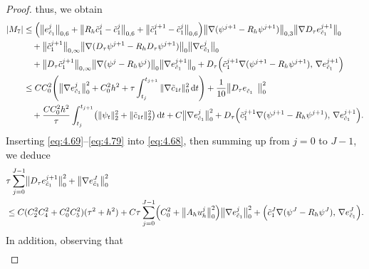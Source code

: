 \documentclass[a4paper,fleqn]{cas-sc}
\numberwithin{equation}{section}
\theoremstyle{definition}
\begin{document}
\begin{proof}
thus, we obtain
\begin{align}
  |M_{7}|
  &\leq \Bigl(\bigl\|e_{\tilde{c}_{1}}^{j}\bigr\|_{0,6}
             + \bigl\|R_{h}\tilde{c}_{1}^{j} - \tilde{c}_{1}^{j}\bigr\|_{0,6}
             + \bigl\|\tilde{c}_{1}^{j+1} - \tilde{c}_{1}^{j}\bigr\|_{0,6}\Bigr)
    \bigl\|\nabla(\psi^{j+1} - R_{h}\psi^{j+1})\bigr\|_{0,3}
    \bigl\|\nabla D_{\tau}e_{\tilde{c}_{1}}^{j+1}\bigr\|_{0}
  \nonumber\\
  &\quad + \bigl\|\tilde{c}_{1}^{j+1}\bigr\|_{0,\infty}
    \bigl\|\nabla(D_{\tau}\psi^{j+1} - R_{h}D_{\tau}\psi^{j+1})\bigr\|_{0}
    \bigl\|\nabla e_{\tilde{c}_{1}}^{j}\bigr\|_{0}
  \nonumber\\
  &\quad + \bigl\|D_{\tau}\tilde{c}_{1}^{j+1}\bigr\|_{0,\infty}
    \bigl\|\nabla(\psi^{j} - R_{h}\psi^{j})\bigr\|_{0}
    \bigl\|\nabla e_{\tilde{c}_{1}}^{j+1}\bigr\|_{0}
  + D_{\tau}\Bigl(\tilde{c}_{1}^{j+1}\nabla(\psi^{j+1} - R_{h}\psi^{j+1}),\,
                   \nabla e_{\tilde{c}_{1}}^{j+1}\Bigr)
  \nonumber\\
  &\leq CC_{0}^{2}\!\left(\bigl\|\nabla e_{\tilde{c}_{1}}^{j}\bigr\|_{0}^{2}
    + C_{0}^{2}h^{2}
    + \tau\int_{t_{j}}^{t_{j+1}}\|\nabla\tilde{c}_{1t}\|_{0}^{2}\,\mathrm{d}t\right)
   + \frac{1}{10}\bigl\|D_{\tau}e_{\tilde{c}_{1}}^{\phantom{j+1}\!}\bigr\|_{0}^{2}
  \nonumber\\
  &\quad + \frac{CC_{0}^{2}h^{2}}{\tau}\int_{t_{j}}^{t_{j+1}}
    \bigl(\|\psi_{t}\|_{2}^{2} + \|\tilde{c}_{1t}\|_{2}^{2}\bigr)\,\mathrm{d}t
   + C\bigl\|\nabla e_{\tilde{c}_{1}}^{j}\bigr\|_{0}^{2}
   + D_{\tau}\Bigl(\tilde{c}_{1}^{j+1}\nabla(\psi^{j+1} - R_{h}\psi^{j+1}),\,
                   \nabla e_{\tilde{c}_{1}}^{j+1}\Bigr).
  \label{eq:4.79}
\end{align}
Inserting \eqref{eq:4.69}--\eqref{eq:4.79} into \eqref{eq:4.68}, then summing up from
$j = 0$ to $J-1$, we deduce
\begin{align}
  &\tau\sum_{j=0}^{J-1}\bigl\|D_{\tau}e_{\tilde{c}_{1}}^{j+1}\bigr\|_{0}^{2}
   + \bigl\|\nabla e_{\tilde{c}_{1}}^{J}\bigr\|_{0}^{2}
  \nonumber\\
  &\leq C(C_{2}^{2}C_{4}^{2} + C_{0}^{2}C_{5}^{2})(\tau^{2}+h^{2})
   + C\tau\sum_{j=0}^{J-1}\Bigl(C_{0}^{2}
                                 + \bigl\|A_{h}u_{h}^{j}\bigr\|_{0}^{2}\Bigr)
    \bigl\|\nabla e_{\tilde{c}_{1}}^{j}\bigr\|_{0}^{2}
   + \Bigl(\tilde{c}_{1}^{J}\nabla(\psi^{J} - R_{h}\psi^{J}),\,
           \nabla e_{\tilde{c}_{1}}^{J}\Bigr).
  \label{eq:4.80}
\end{align}
In addition, observing that
\begin{align}

\end{align}
\end{proof}
\end{document}
